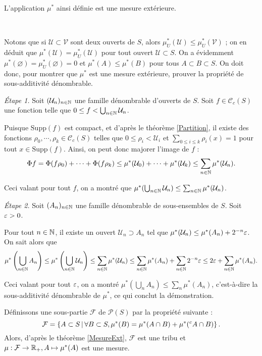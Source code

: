 \documentclass{article}
\begin{document}
\begin{Thm} L'application $\mu^*$ ainsi définie est une mesure extérieure. \end{Thm}

\begin{Dem}~

Notons que si $\mathcal U\subset\mathcal V$ sont deux ouverts de $S$, alors $\mu_U^*(\mathcal U)\leq\mu_U^*(\mathcal V)$ ; on en déduit que $\mu^*(\mathcal U)=\mu_U^*(\mathcal U)$ pour tout ouvert $\mathcal U\subset S$. On a évidemment $\mu^*(\varnothing)=\mu^*_U(\varnothing)=0$ et $\mu^*(A)\leq\mu^*(B)$ pour tous $A\subset B\subset S$. On doit donc, pour montrer que $\mu^*$ est une mesure extérieure, prouver la propriété de sous-additivité dénombrable.

\emph{Étape 1.} Soit $(\mathcal U_n)_{n\in\mathbb{N}}$ une famille dénombrable d'ouverts de $S$. Soit $f\in\mathcal C_c(S)$ une fonction telle que $0\leq f<\bigcup_{n\in\mathbb{N}}\mathcal U_n$.

Puisque $\mathrm{Supp}(f)$ est compact, et d'après le théorème \ref{Partition}, il existe des fonctions $\rho_0,\cdots,\rho_k\in\mathcal C_c(S)$ telles que $0\leq\rho_i<\mathcal U_i$ et $\sum_{0\leq i\leq k}\rho_i(x)=1$ pour tout $x\in\mathrm{Supp}(f)$. Ainsi, on peut donc majorer l'image de $f$ :
$$\Phi f=\Phi(f\rho_0)+\cdots+\Phi(f\rho_k)\leq\mu^*(\mathcal U_0)+\cdots+\mu^*(\mathcal U_k)\leq\sum_{n\in\mathbb{N}}\mu^*(\mathcal U_n)\text.$$

Ceci valant pour tout $f$, on a montré que $\mu^*(\bigcup_{n\in\mathbb{N}}\mathcal U_n)\leq\sum_{n\in\mathbb{N}}\mu^*(\mathcal U_n)$.

\emph{Étape 2.} Soit $(A_n)_{n\in\mathbb{N}}$ une famille dénombrable de sous-ensembles de $S$. Soit $\varepsilon>0$.

Pour tout $n\in\mathbb{N}$, il existe un ouvert $\mathcal U_n\supset A_n$ tel que $\mu^*(\mathcal U_n)\leq\mu^*(A_n)+2^{-n}\varepsilon$. On sait alors que
$$\mu^*\left(\bigcup_{n\in\mathbb{N}}A_n\right)
   \leq \mu^*\left(\bigcup_{n\in\mathbb{N}}\mathcal U_n\right)
   \leq \sum_{n\in\mathbb{N}}\mu^*(\mathcal U_n)
   \leq \sum_{n\in\mathbb{N}}\mu^*(A_n)+\sum_{n\in\mathbb{N}}2^{-n}\varepsilon
   \leq 2\varepsilon+\sum_{n\in\mathbb{N}}\mu^*(A_n)\text.$$

Ceci valant pour tout $\varepsilon$, on a montré $\mu^*(\bigcup_nA_n)\leq\sum_n\mu^*(A_n)$, c'est-à-dire la sous-additivité dénombrable de $\mu^*$, ce qui conclut la démonstration.
\end{Dem}

Définissons une sous-partie $\mathcal F$ de $\mathcal P(S)$ par la propriété suivante :
$$\mathcal F=\left\{A\subset S\,|\,\forall B\subset S,
                    \mu^*(B)=\mu^*(A\cap B)+\mu^*(^cA\cap B)\right\}\text.$$
Alors, d'après le théorème \ref{MesureExt}, $\mathcal F$ est une tribu et $\mu:\mathcal F\to\mathbb{R}_+,A\mapsto\mu^*(A)$ est une mesure.
\end{document}
